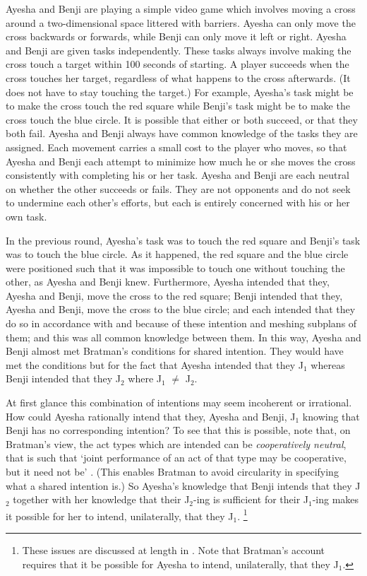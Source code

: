 \documentclass[12pt,\papersize]{extarticle}
\begin{document}
Ayesha and Benji  are playing a simple video game which involves moving a cross around a two-dimensional space littered with barriers.
Ayesha can only move the cross backwards or forwards,
while Benji can only move it left or right.
Ayesha and Benji are given tasks independently. 
These tasks always involve making the cross touch a target within 100 seconds of starting. 
A player succeeds when the cross touches her target, regardless of what happens to the cross afterwards.  
(It does not have to stay touching the target.)
For example, 
	Ayesha's task might be to make the cross touch the red square
	while
	Benji's task might be to make the cross touch the blue circle. 
It is possible that either or both succeed, or that they both fail.
Ayesha and Benji always have common knowledge of the tasks they are assigned.
Each movement carries a small cost to the player who moves, so that Ayesha and Benji each attempt to minimize how much he or she moves the cross consistently with completing his or her task.
Ayesha and Benji are each neutral on whether the other succeeds or fails.
They are not opponents and do not seek to undermine each other's efforts, but each is entirely concerned  with his or her own task.




In the previous round, 
	Ayesha's task was to touch the red square
	and
	Benji's task was to touch the blue circle.
As it happened, the red square and the blue circle were positioned such that it was impossible to touch one without touching the other, as Ayesha and Benji knew.
Furthermore, Ayesha intended that they, Ayesha and Benji, move the cross to the red square; Benji intended that they, Ayesha and Benji, move the cross to the blue circle; and each intended that they do so in accordance with and because of these intention and meshing subplans of them; and this was all common knowledge between them.
In this way, Ayesha and Benji almost met Bratman's conditions for shared intention.
They would have met the conditions but for the fact that Ayesha intended that they J$_1$ whereas Benji intended that they J$_2$ where J$_1$ $\neq$ J$_2$.

At first glance this combination of intentions may seem incoherent or irrational. 
How could Ayesha rationally intend that they, Ayesha and Benji, J$_1$ knowing that Benji has no corresponding intention? 
To see that this is possible, note that, on Bratman's view,
 the act types which are intended can be \emph{cooperatively neutral}, that is such that `joint performance of an act of that type may be cooperative, but it need not be' \citep[p.\ 330]{Bratman:1992mi}.
(This enables Bratman to avoid circularity in specifying what a shared intention is.)  
So Ayesha's knowledge that Benji intends that they J$_2$ together with her knowledge that their J$_2$-ing is sufficient for their J$_1$-ing makes it possible for her to intend, unilaterally, that they J$_1$.%
\footnote{
These issues are discussed at length in \citet{Bratman:1999fr}. 
Note that Bratman's account requires that it be possible for Ayesha to intend, unilaterally, that they J$_1$.%
}
\end{document}
